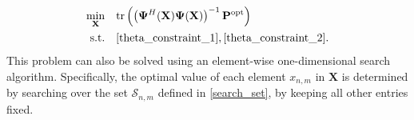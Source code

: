 \begin{subequations} \label{ZF_BF_problem_Theta}
    \begin{align}
        \label{ZF_BF_problem_obj}
        \min_{\mathbf{X}} \quad & \mathrm{tr}\left( \left( \mathbf{\Psi}^H(\mathbf{X}) \mathbf{\Psi}(\mathbf{X}) \right)^{-1} \mathbf{P}^{\mathrm{opt}} \right) \\
        \mathrm{s.t.} \quad & \eqref{theta_constraint_1}, \eqref{theta_constraint_2}.
    \end{align}
\end{subequations}
This problem can also be solved using an element-wise one-dimensional search algorithm. Specifically, the optimal value of each element $x_{n,m}$ in $\mathbf{X}$ is determined by searching over the set $\mathcal{S}_{n,m}$ defined in \eqref{search_set}, by keeping all other entries fixed. 

